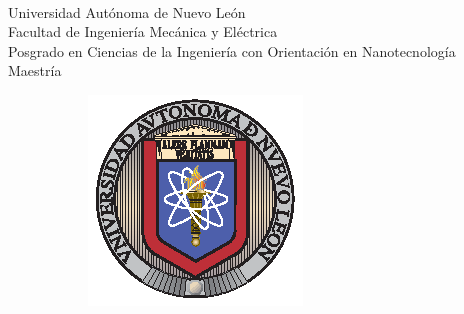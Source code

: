 \documentclass[letterpaper, 10 pt, conference]{article}
\begin{document}
\thispagestyle{empty}
\vspace{10 cm}
\begin{scshape}
\begin{center}
	{$\,$} \\[20 mm]
	{\Large{Universidad Autónoma de Nuevo León}} \\[5mm]
	{\large{Facultad de Ingeniería Mecánica y Eléctrica}} \\[5mm]
	{\large{Posgrado en Ciencias de la Ingeniería con Orientación en Nanotecnología}} \\[5 mm]
	{\large{Maestría}}
	\vskip16mm
	\begin{figure}[h!]
		\centering
		\begin{subfigure}{0.3\linewidth}
			\includegraphics[width=\linewidth]{uanl.eps}
		\end{subfigure}
		\hspace{15 mm}
		\begin{subfigure}{0.2\linewidth}

\end{subfigure}
\end{figure}
\end{center}
\end{scshape}
\end{document}

